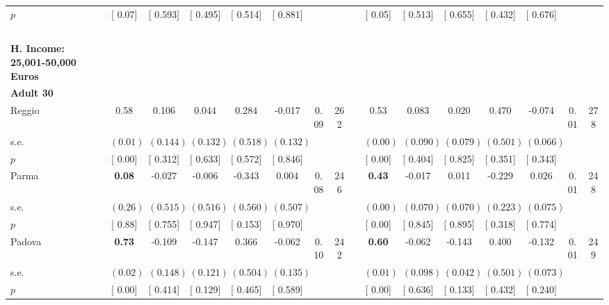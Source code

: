 \begin{longtable}{L{8em} c c c c c c c p{1em} c c c c c c c}
\quad \quad \quad \quad $ p$ & [     0.07] & [    0.593] & [    0.495] & [    0.514] & [    0.881] & & & & [     0.05] & [    0.513] & [    0.655] & [    0.432] & [    0.676] & &  \\[1em]
~\\[1em]
\textbf{H. Income: 25,001-50,000 Euros} \\*
\quad \quad \textbf{Adult 30} & & & & & & & & & & & & & & & \\* 
\quad \quad \quad Reggio& 0.58 &     0.106 &     0.044 &     0.284 &    -0.017 &      0.09 &       262 & & 0.53 &     0.083 &     0.020 &     0.470 &    -0.074 &      0.01 &       278  \\*
\quad \quad \quad \quad s.e.& $ (     0.01)$ & $ (    0.144)$ & $ (    0.132)$ & $ (    0.518)$ & $ (    0.132)$ & & & & $ (     0.00)$ & $ (    0.090)$ & $ (    0.079)$ & $ (    0.501)$ & $ (    0.066)$ & &  \\*
\quad \quad \quad \quad $ p$ & [     0.00] & [    0.312] & [    0.633] & [    0.572] & [    0.846] & & & & [     0.00] & [    0.404] & [    0.825] & [    0.351] & [    0.343] & &  \\[1em]
\quad \quad \quad Parma& \textbf{     0.08} &    -0.027 &    -0.006 &    -0.343 &     0.004 &      0.08 &       246 & & \textbf{     0.43} &    -0.017 &     0.011 &    -0.229 &     0.026 &      0.01 &       248  \\*
\quad \quad \quad \quad s.e.& $ (     0.26)$ & $ (    0.515)$ & $ (    0.516)$ & $ (    0.560)$ & $ (    0.507)$ & & & & $ (     0.00)$ & $ (    0.070)$ & $ (    0.070)$ & $ (    0.223)$ & $ (    0.075)$ & &  \\*
\quad \quad \quad \quad $ p$ & [     0.88] & [    0.755] & [    0.947] & [    0.153] & [    0.970] & & & & [     0.00] & [    0.845] & [    0.895] & [    0.318] & [    0.774] & &  \\[1em]
\quad \quad \quad Padova& \textbf{     0.73} &    -0.109 &    -0.147 &     0.366 &    -0.062 &      0.10 &       242 & & \textbf{     0.60} &    -0.062 &    -0.143 &     0.400 &    -0.132 &      0.01 &       249  \\*
\quad \quad \quad \quad s.e.& $ (     0.02)$ & $ (    0.148)$ & $ (    0.121)$ & $ (    0.504)$ & $ (    0.135)$ & & & & $ (     0.01)$ & $ (    0.098)$ & $ (    0.042)$ & $ (    0.501)$ & $ (    0.073)$ & &  \\*
\quad \quad \quad \quad $ p$ & [     0.00] & [    0.414] & [    0.129] & [    0.465] & [    0.589] & & & & [     0.00] & [    0.636] & [    0.133] & [    0.432] & [    0.240] & &  \\[1em]

\end{longtable}

